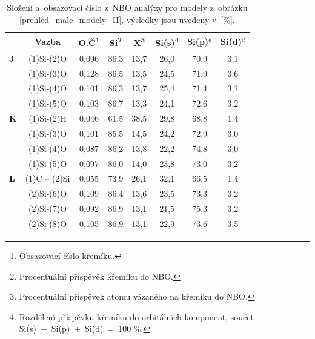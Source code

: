 \documentclass[
digital, %
table,   %
nolof,     %
nolot,     %
oneside,
]{fithesis3}
\begin{document}
\begin{table}[H]
\caption{Složení a~obsazovací číslo z~NBO analýzy pro modely z~obrázku \ref{prehled_male_modely_II}, výsledky jsou uvedeny v~[\%].}
\begin{minipage}{\textwidth}
\begin{center}
\begin{tabular}{|l|c|c|c|c|c|c|c|}
\hline\label{nbo_reaktanty_porovnani}&  Vazba & O.Č\footnote{Obsazovací číslo křemíku.} & Si\footnote{Procentuální příspěvěk křemíku do NBO.} & X\footnote{Procentuální příspěvek atomu vázaného na křemíku do NBO.} & Si(s)\footnote{Rozdělení příspěvku křemíku do orbitálních komponent, součet Si(s)~+~Si(p)~+~Si(d)~=~100 \%.} & Si(p)$^d$ &Si(d)$^d$ \\ \hline
\textbf{J} & (1)Si-(2)O & 0,096 & 86,3  & 13,7  & 26,0  & 70,9  & 3,1  \\ \hline
& (1)Si-(3)O & 0,128 & 86,5  & 13,5  & 24,5  & 71,9  & 3,6  \\ \hline
& (1)Si-(4)O & 0,101 & 86,3  & 13,7  & 25,4  & 71,4  & 3,1  \\ \hline
& (1)Si-(5)O & 0,103 & 86,7  & 13,3  & 24,1  & 72,6  & 3,2  \\ \hline

\textbf{K} & (1)Si-(2)H & 0,046 & 61,5  & 38,5  & 29,8  & 68,8  & 1,4  \\ \hline
& (1)Si-(3)O & 0,101 & 85,5  & 14,5  & 24,2  & 72,9  & 3,0  \\ \hline
& (1)Si-(4)O & 0,087 & 86,2  & 13,8  & 22,2  & 74,8  & 3,0  \\ \hline
& (1)Si-(5)O & 0,097 & 86,0  & 14,0  & 23,8  & 73,0  & 3,2  \\ \hline
\textbf{L} & (1)C -- (2)Si & 0,055 & 73,9  & 26,1  & 32,1  & 66,5  & 1,4  \\ \hline
& (2)Si-(6)O & 0,109 & 86,4  & 13,6  & 23,5  & 73,3  & 3,2  \\ \hline
& (2)Si-(7)O & 0,092 & 86,9  & 13,1  & 21,5  & 75,3  & 3,2  \\ \hline
& (2)Si-(8)O & 0,105 & 86,9  & 13,1  & 22,9  & 73,6  & 3,5  \\ \hline
\end{tabular}
\end{center}\end{minipage}\end{table}
\end{document}
